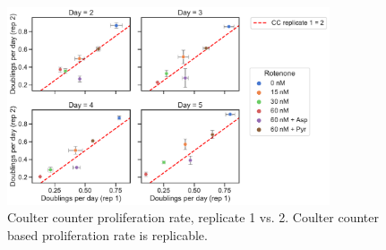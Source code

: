 \begin{figure}[ht]
    \centering
    \includegraphics[width=0.85\textwidth]{figures/sapp/IC/prlfr_CCvsCC-byday.pdf}
    \caption[Coulter counter proliferation rate, replicate 1 vs. 2.]{
    Coulter counter proliferation rate, replicate 1 vs. 2.
    Coulter counter based proliferation rate is replicable.
    }
    \label{fig:sapp:IC:CCvsCC2}
\end{figure}

